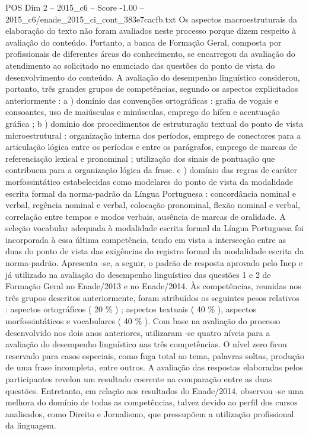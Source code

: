 \begin{textsample}{POS Dim 2 – 2015\_c6 – Score -1.00 – 2015\_c6/enade\_2015\_ci\_cont\_383e7cacfb.txt}
Os aspectos macroestruturais da elaboração do texto não foram avaliados neste processo porque dizem respeito à avaliação do conteúdo.
Portanto, a banca de Formação Geral, composta por profissionais de diferentes áreas do conhecimento, se encarregou da avaliação do atendimento ao solicitado no enunciado das questões do ponto de vista do desenvolvimento do conteúdo.
A avaliação do desempenho linguístico considerou, portanto, três grandes grupos de competências, segundo os aspectos explicitados anteriormente : a ) domínio das convenções ortográficas : grafia de vogais e consoantes, uso de maiúsculas e minúsculas, emprego do hífen e acentuação gráfica ; b ) domínio dos procedimentos de estruturação textual do ponto de vista microestrutural : organização interna dos períodos, emprego de conectores para a articulação lógica entre os períodos e entre os parágrafos, emprego de marcas de referenciação lexical e pronominal ; utilização dos sinais de pontuação que contribuem para a organização lógica da frase. c ) domínio das regras de caráter morfossintático estabelecidas como modelares do ponto de vista da modalidade escrita formal da norma-padrão da Língua Portuguesa : concordância nominal e verbal, regência nominal e verbal, colocação pronominal, flexão nominal e verbal, correlação entre tempos e modos verbais, ausência de marcas de oralidade.
A seleção vocabular adequada à modalidade escrita formal da Língua Portuguesa foi incorporada à essa última competência, tendo em vista a intersecção entre as duas do ponto de vista das exigências do registro formal da modalidade escrita da norma-padrão.
Apresenta -se, a seguir, o padrão de resposta aprovado pelo Inep e já utilizado na avaliação do desempenho linguístico das questões 1 e 2 de Formação Geral no Enade/2013 e no Enade/2014.
Às competências, reunidas nos três grupos descritos anteriormente, foram atribuídos os seguintes pesos relativos : aspectos ortográficos ( 20 \% ) ; aspectos textuais ( 40 \% ), aspectos morfossintáticos e vocabulares ( 40 \% ).
Com base na avaliação do processo desenvolvido nos dois anos anteriores, utilizaram -se quatro níveis para a avaliação do desempenho linguístico nas três competências.
O nível zero ficou reservado para casos especiais, como fuga total ao tema, palavras soltas, produção de uma frase incompleta, entre outros.
A avaliação das respostas elaboradas pelos participantes revelou um resultado coerente na comparação entre as duas questões.
Entretanto, em relação aos resultados do Enade/2014, observou -se uma melhora do domínio de todas as competências, talvez devido ao perfil dos cursos analisados, como Direito e Jornalismo, que pressupõem a utilização profissional da linguagem.

\end{textsample}
